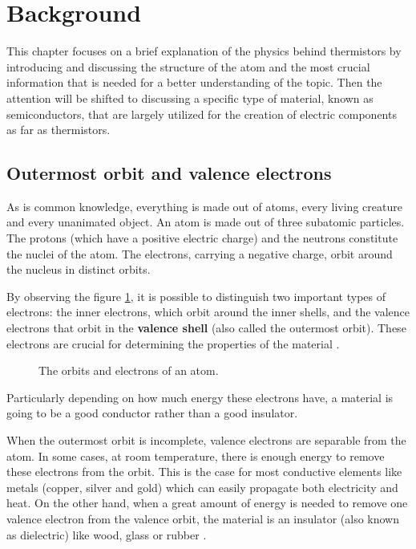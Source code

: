 \vspace{30px}\section{Background}
This chapter focuses on a brief explanation of the physics behind thermistors by introducing and discussing the structure of the atom and the most crucial information that is needed for a better understanding of the topic. Then the attention will be shifted to discussing a specific type of material, known as semiconductors, that are largely utilized for the creation of electric components as far as thermistors.


\subsection{Outermost orbit and valence electrons}
As is common knowledge, everything is made out of atoms, every living creature and every unanimated object. An atom is made out of three subatomic particles. The protons (which have a positive electric charge) and the neutrons constitute the nuclei of the atom. The electrons, carrying a negative charge, orbit around the nucleus in distinct orbits.

By observing the figure \ref{fig:atom-structure}, it is possible to distinguish two important types of electrons: the inner electrons, which orbit around the inner shells, and the valence electrons that orbit in the \textbf{valence shell} (also called the outermost orbit). These electrons are crucial for determining the properties of the material \cite{Gupta20163}.
\begin{figure}[h]
    \centering
    
    \caption{The orbits and electrons of an atom.}
    \label{fig:atom-structure}
\end{figure}
Particularly depending on how much energy these electrons have, a material is going to be a good conductor rather than a good insulator.

When the outermost orbit is incomplete, valence electrons are separable from the atom. In some cases, at room temperature, there is enough energy to remove these electrons from the orbit. This is the case for most conductive elements like metals (copper, silver and gold) which can easily propagate both electricity and heat. On the other hand, when a great amount of energy is needed to remove one valence electron from the valence orbit, the material is an insulator (also known as dielectric) like wood, glass or rubber \cite{Gupta20163}. 

